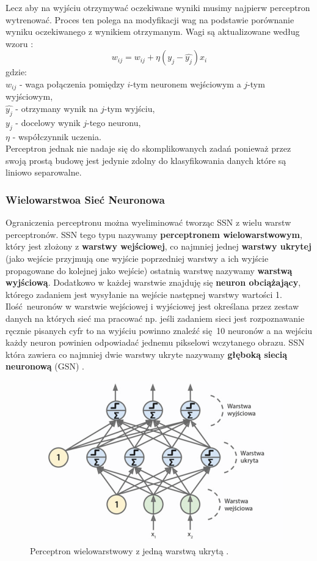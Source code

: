 \documentclass{article}
\begin{document}
Lecz aby na wyjściu otrzymywać oczekiwane wyniki musimy najpierw perceptron wytrenować. Proces
ten polega na modyfikacji wag na podstawie porównanie wyniku oczekiwanego z wynikiem otrzymanym.
Wagi są aktualizowane według wzoru \cite{um}:
\begin{equation}
	w_{ij} = w_{ij} + \eta(y_j - \hat{y_j})x_i
\end{equation}
gdzie:\\
$w_{ij}$ - waga połączenia pomiędzy $i$-tym neuronem wejściowym a $j$-tym wyjściowym,\\
$\hat{y_j}$ - otrzymany wynik na $j$-tym wyjściu,\\
$y_j$ - docelowy wynik $j$-tego neuronu,\\
$\eta$ - współczynnik uczenia.\\
Perceptron jednak nie nadaje się do skomplikowanych zadań ponieważ przez swoją prostą budowę
jest jedynie zdolny do klasyfikowania danych które są liniowo separowalne.

\subsubsection{Wielowarstwoa Sieć Neuronowa}
Ograniczenia perceptronu można wyeliminować tworząc SSN z wielu warstw perceptronów.
SSN tego typu nazywamy \textbf{perceptronem wielowarstwowym}, który jest złożony z 
\textbf{warstwy wejściowej}, co najmniej jednej \textbf{warstwy ukrytej} (jako wejście przyjmują
one wyjście poprzedniej warstwy a ich wyjście propagowane do kolejnej jako wejście) ostatnią
warstwę nazywamy \textbf{warstwą wyjściową}. Dodatkowo w każdej warstwie znajduję się 
\textbf{neuron obciążający}, którego zadaniem jest wysyłanie na wejście następnej warstwy 
wartości 1. Ilość neuronów w warstwie wejściowej i wyjściowej jest określana przez
zestaw danych na których sieć ma pracować np. jeśli zadaniem sieci jest rozpoznawanie
ręcznie pisanych cyfr to na wyjściu powinno znaleźć się 10 neuronów a na wejściu każdy neuron
powinien odpowiadać jednemu pikselowi wczytanego obrazu.
SSN która zawiera co najmniej dwie warstwy ukryte nazywamy
\textbf{głęboką siecią neuronową} (GSN) \cite{um}.

\begin{figure}[H]
\centering
\includegraphics[scale=0.5]{gsn.png}
\caption{Perceptron wielowarstwowy z jedną warstwą ukrytą \cite{um}.}
\end{figure}
\end{document}
